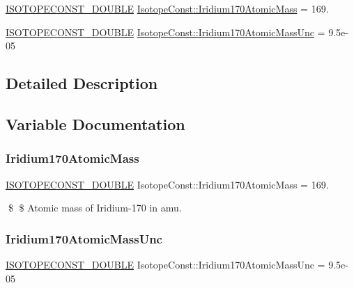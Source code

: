 \begin{DoxyCompactItemize}
\item 
\mbox{\hyperlink{group___isotope_const-_macros_ga8f45a7272ce02c0b4c65c44636ed719a}{I\+S\+O\+T\+O\+P\+E\+C\+O\+N\+S\+T\+\_\+\+D\+O\+U\+B\+LE}} \mbox{\hyperlink{group___isotope_const-_iridium-_ir170_ga99b2fa2e3d4c59e381cdfc096f5d4ca0}{Isotope\+Const\+::\+Iridium170\+Atomic\+Mass}} = 169.
\item 
\mbox{\hyperlink{group___isotope_const-_macros_ga8f45a7272ce02c0b4c65c44636ed719a}{I\+S\+O\+T\+O\+P\+E\+C\+O\+N\+S\+T\+\_\+\+D\+O\+U\+B\+LE}} \mbox{\hyperlink{group___isotope_const-_iridium-_ir170_ga18f6224136fe4d43f2c619d90fa1803f}{Isotope\+Const\+::\+Iridium170\+Atomic\+Mass\+Unc}} = 9.\+5e-\/05
\end{DoxyCompactItemize}


\subsection{Detailed Description}


\subsection{Variable Documentation}
\mbox{\label{group___isotope_const-_iridium-_ir170_ga99b2fa2e3d4c59e381cdfc096f5d4ca0}} 
\subsubsection{\texorpdfstring{Iridium170\+Atomic\+Mass}{Iridium170AtomicMass}}
{\footnotesize\ttfamily \mbox{\hyperlink{group___isotope_const-_macros_ga8f45a7272ce02c0b4c65c44636ed719a}{I\+S\+O\+T\+O\+P\+E\+C\+O\+N\+S\+T\+\_\+\+D\+O\+U\+B\+LE}} Isotope\+Const\+::\+Iridium170\+Atomic\+Mass = 169.}

\$ \$ Atomic mass of Iridium-\/170 in amu. \mbox{\label{group___isotope_const-_iridium-_ir170_ga18f6224136fe4d43f2c619d90fa1803f}} 
\subsubsection{\texorpdfstring{Iridium170\+Atomic\+Mass\+Unc}{Iridium170AtomicMassUnc}}
{\footnotesize\ttfamily \mbox{\hyperlink{group___isotope_const-_macros_ga8f45a7272ce02c0b4c65c44636ed719a}{I\+S\+O\+T\+O\+P\+E\+C\+O\+N\+S\+T\+\_\+\+D\+O\+U\+B\+LE}} Isotope\+Const\+::\+Iridium170\+Atomic\+Mass\+Unc = 9.\+5e-\/05}

